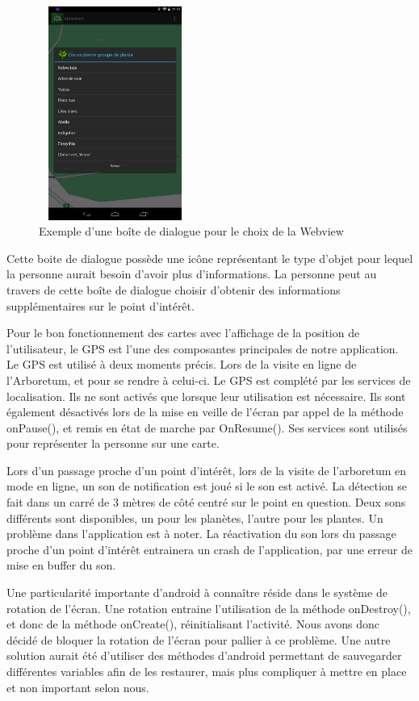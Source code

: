 \documentclass[a4paper,11pt]{article}
\begin{document}
			\begin{figure}[H]
     \begin{center}
      \includegraphics[width=5cm,height=7cm]{menuchoix.png}
      \caption{Exemple d'une boîte de dialogue pour le choix de la Webview}
     \end{center}
    \end{figure}
			Cette boite de dialogue possède une icône représentant le type d'objet pour lequel la personne aurait besoin d'avoir plus d'informations. La personne peut au travers de cette boîte de dialogue choisir d'obtenir des informations supplémentaires sur le point d'intérêt.
		
		Pour le bon fonctionnement des cartes avec l’affichage de la position de l'utilisateur, le GPS est l'une des composantes principales de notre application. Le GPS est utilisé à deux moments précis. Lors de la visite en ligne de l'Arboretum, et pour se rendre à celui-ci. Le GPS est complété par les services de localisation. Ils ne sont activés que lorsque leur utilisation est nécessaire. Ils sont également désactivés lors de la mise en veille de l'écran par appel de la méthode onPause(), et remis en état de marche par OnResume(). Ses services sont utilisés pour représenter la personne sur une carte.
		
		Lors d'un passage proche d'un point d'intérêt, lors de la visite de l'arboretum en mode en ligne, un son de notification est joué si le son est activé. La détection se fait dans un carré de 3 mètres de côté centré sur le point en question. Deux sons différents sont disponibles, un pour les planètes, l'autre pour les plantes. Un problème dans l'application est à noter. La réactivation du son lors du passage proche d'un point d'intérêt entrainera un crash de l'application, par une erreur de mise en buffer du son.
		
		Une particularité importante d'android à connaître réside dans le système de rotation de l'écran. Une rotation entraine l'utilisation de la méthode onDestroy(), et donc de la méthode onCreate(), réinitialisant l'activité. Nous avons donc décidé de bloquer la rotation de l'écran pour pallier à ce problème. Une autre solution aurait été d'utiliser des méthodes d'android permettant de sauvegarder différentes variables afin de les restaurer, mais plus compliquer à mettre en place et non important selon nous.
		
\end{document}
